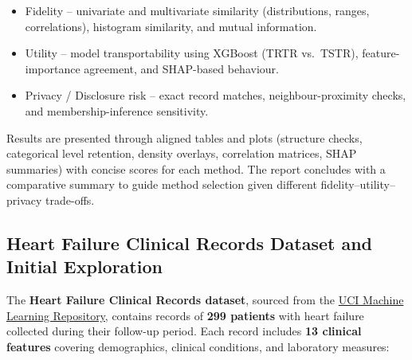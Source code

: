 \documentclass[
  letterpaper,
  DIV=11,
  numbers=noendperiod]{scrartcl}
\providecommand{\tightlist}{%
  \setlength{\itemsep}{0pt}\setlength{\parskip}{0pt}}\usepackage{longtable,booktabs,array}
\begin{document}
\begin{itemize}
\tightlist
\item
  Fidelity -- univariate and multivariate similarity (distributions,
  ranges, correlations), histogram similarity, and mutual information.
\item
  Utility -- model transportability using XGBoost (TRTR vs.~TSTR),
  feature-importance agreement, and SHAP-based behaviour.
\item
  Privacy / Disclosure risk -- exact record matches, neighbour-proximity
  checks, and membership-inference sensitivity.
\end{itemize}

Results are presented through aligned tables and plots (structure
checks, categorical level retention, density overlays, correlation
matrices, SHAP summaries) with concise scores for each method. The
report concludes with a comparative summary to guide method selection
given different fidelity--utility--privacy trade-offs.

\subsection{Heart Failure Clinical Records Dataset and Initial
Exploration}\label{heart-failure-clinical-records-dataset-and-initial-exploration}

The \textbf{Heart Failure Clinical Records dataset}, sourced from the
\href{https://archive.ics.uci.edu/dataset/519/heart+failure+clinical+records}{UCI
Machine Learning Repository}, contains records of \textbf{299 patients}
with heart failure collected during their follow-up period. Each record
includes \textbf{13 clinical features} covering demographics, clinical
conditions, and laboratory measures:
\end{document}
